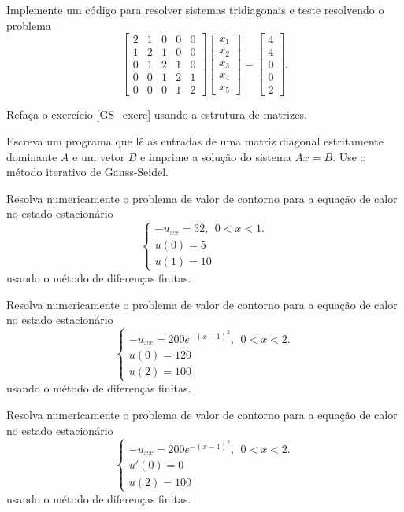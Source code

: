 \begin{exer}
Implemente um código para resolver sistemas tridiagonais e teste resolvendo o problema
$$ \begin{bmatrix}
   { 2 } & { 1 } & { 0 } & { 0 } & { 0 } \\
   { 1 } & { 2 } & { 1 } & { 0 } & { 0 } \\
   { 0 } & { 1 } & { 2 } & { 1 } & { 0 } \\
   { 0 } & { 0 } & { 1 } & { 2 } & { 1 } \\
   { 0 } & { 0 } & { 0 } & { 1 } & { 2 }
 \end{bmatrix}
\begin{bmatrix}
   {x_1 }  \\
   {x_2 }  \\
   {x_3 }  \\
   {x_4 }  \\
   {x_5 }
\end{bmatrix}
=
\begin{bmatrix}
   {4}  \\
   {4 }  \\
   {0}  \\
   {0}\\
   {2 }
\end{bmatrix}
.
$$
\end{exer}


\begin{exer}Refaça o exercício \ref{GS_exerc} usando a estrutura de matrizes.
 
\end{exer}

\begin{exer}Escreva um programa que lê as entradas de uma matriz diagonal estritamente dominante $A$ e um vetor $B$ e imprime a solução do sistema $Ax=B$. Use o método iterativo de Gauss-Seidel.
\end{exer}


\begin{exer}\label{exerc_8.1}Resolva numericamente o problema de valor de contorno para a equação de calor no estado estacionário
$$\left\{\begin{array}{l}-u_{xx}=32,~~ 0<x<1.\\
u(0)=5\\
u(1)=10\end{array}
\right.
$$
usando o método de diferenças finitas.
\end{exer}

\begin{exer}\label{exerc_8.2}Resolva numericamente o problema de valor de contorno para a equação de calor no estado estacionário
$$\left\{\begin{array}{l}-u_{xx}=200e^{-(x-1)^2},~~ 0<x<2.\\
u(0)=120\\
u(2)=100\end{array}
\right.
$$
usando o método de diferenças finitas.
\end{exer}

\begin{exer}\label{exerc_8.3}Resolva numericamente o problema de valor de contorno para a equação de calor no estado estacionário
$$\left\{\begin{array}{l}-u_{xx}=200e^{-(x-1)^2},~~ 0<x<2.\\
u'(0)=0\\
u(2)=100\end{array}
\right.
$$
usando o método de diferenças finitas.
\end{exer}
